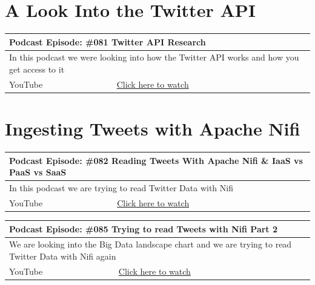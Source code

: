 \documentclass[12pt, numbers=noenddot]{scrreprt} %
\begin{document}
\chapter{A Look Into the Twitter API}

\begin{table}[h]
\begin{tabular}{ll}
\hline
\multicolumn{2}{l}{\textbf{Podcast Episode:} \#081 Twitter API Research} \\ \hline
\multicolumn{2}{p{15cm}}{In this podcast we were looking into how the Twitter API works and how you get access to it}         \\ \hline
\multicolumn{1}{l|}{YouTube}   & \href{https://youtu.be/UnAXKxeIlyg}{Click here to watch}   \\ \hline
\end{tabular}
\end{table}


\chapter{Ingesting Tweets with Apache Nifi}

\begin{table}[h]
\begin{tabular}{ll}
\hline
\multicolumn{2}{l}{\textbf{Podcast Episode:} \#082 Reading Tweets With Apache Nifi \& IaaS vs PaaS vs SaaS} \\ \hline
\multicolumn{2}{p{15cm}}{In this podcast we are trying to read Twitter Data with Nifi}         \\ \hline
\multicolumn{1}{l|}{YouTube}   & \href{https://youtu.be/pWuT4UAocUY}{Click here to watch}   \\ \hline
\end{tabular}
\end{table}

\begin{table}[h]
\begin{tabular}{ll}
\hline
\multicolumn{2}{l}{\textbf{Podcast Episode:} \#085 Trying to read Tweets with Nifi Part 2} \\ \hline
\multicolumn{2}{p{15cm}}{We are looking into the Big Data landscape chart and we are trying to read Twitter Data with Nifi again}         \\ \hline
\multicolumn{1}{l|}{YouTube}   & \href{https://youtu.be/OLUwXr8-gAk}{Click here to watch}   \\ \hline
\end{tabular}
\end{table}
\end{document}
